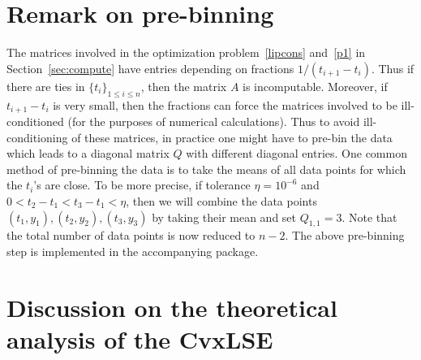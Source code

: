 {\section{Remark on pre-binning}\label{rem:bin}
{ The matrices involved in the optimization problem~\eqref{lipcons} and~\eqref{p1} in Section~\ref{sec:compute} have entries depending on fractions $1/(t_{i+1} - t_i)$. Thus if there are ties in $\{t_i\}_{1\le i \le n}$, then the matrix $A$ is incomputable. Moreover, if $t_{i+1} - t_i$ is very small, then the fractions can force the matrices involved to be ill-conditioned (for the purposes of numerical calculations). Thus  to avoid ill-conditioning of these matrices, in practice one might have to pre-bin the data which leads to a diagonal matrix $Q$ with different diagonal entries. One common method of pre-binning the data is to take the means of all data points for which the $t_i$'s are close. To be more precise, if tolerance  $\eta = 10^{-6}$ and $0 < t_2 - t_1 < t_3 - t_1 < \eta$, then we will combine the data points $(t_1, y_1), (t_2, y_2), (t_3, y_3)$ by taking their mean and set $Q_{1,1} = 3$. Note that the total number of data points is now reduced to $n-2$. The above pre-binning step is implemented in the accompanying package. 
}

\section{Discussion on the theoretical analysis of the {CvxLSE}} %
\label{sec:discussion_on_the_theoretical_analysis_of_the_texttt_CvxLSE}

}
